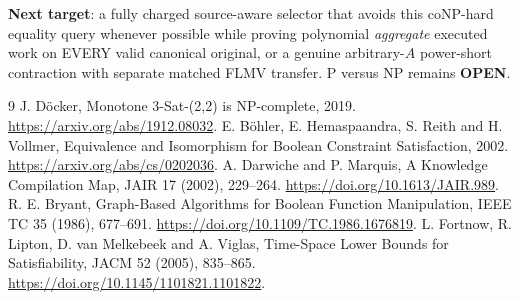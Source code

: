 \documentclass[11pt]{article}
\begin{document}
\noindent\textbf{Next target}: a fully charged source-aware selector that avoids this coNP-hard equality query whenever possible while proving polynomial \emph{aggregate} executed work on EVERY valid canonical original, or a genuine arbitrary-$A$ power-short contraction with separate matched FLMV transfer. P versus NP remains \textbf{OPEN}.

\begin{thebibliography}{9}
 J. D\"ocker, Monotone 3-Sat-(2,2) is NP-complete, 2019. \url{https://arxiv.org/abs/1912.08032}.
 E. B\"ohler, E. Hemaspaandra, S. Reith and H. Vollmer, Equivalence and Isomorphism for Boolean Constraint Satisfaction, 2002. \url{https://arxiv.org/abs/cs/0202036}.
 A. Darwiche and P. Marquis, A Knowledge Compilation Map, JAIR 17 (2002), 229--264. \url{https://doi.org/10.1613/JAIR.989}.
 R. E. Bryant, Graph-Based Algorithms for Boolean Function Manipulation, IEEE TC 35 (1986), 677--691. \url{https://doi.org/10.1109/TC.1986.1676819}.
 L. Fortnow, R. Lipton, D. van Melkebeek and A. Viglas, Time-Space Lower Bounds for Satisfiability, JACM 52 (2005), 835--865. \url{https://doi.org/10.1145/1101821.1101822}.
\end{thebibliography}
\end{document}
